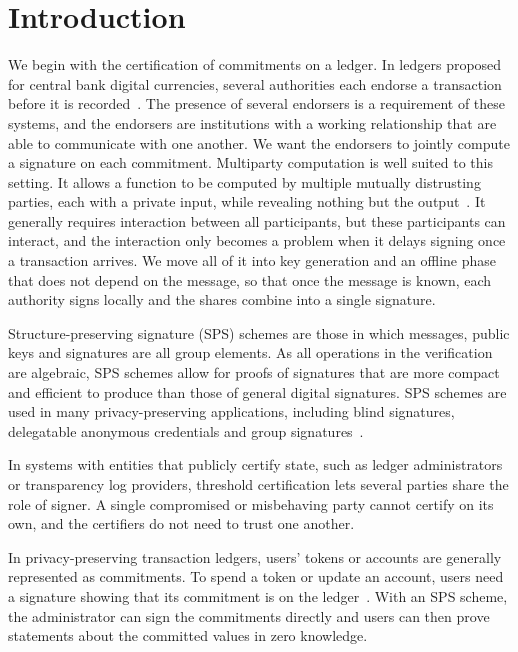 \section{Introduction}\label{sec:tsps-introduction}

We begin with the certification of commitments on a ledger. In ledgers
proposed for central bank digital currencies, several authorities each endorse
a transaction before it is recorded~\cite{androulaki2020auditable}. The
presence of several endorsers is a requirement of these systems, and the
endorsers are institutions with a working relationship that are able to
communicate with one another. We want the endorsers to jointly compute a
signature on each commitment. Multiparty computation is well suited to this
setting. It allows a function to be computed by multiple mutually distrusting
parties, each with a private input, while revealing nothing but the
output~\cite{FOCS:Yao86,STOC:GolMicWig87}. It generally requires interaction
between all participants, but these participants can interact, and the
interaction only becomes a problem when it delays signing once a transaction
arrives. We move all of it into key generation and an offline phase that does
not depend on the message, so that once the message is known, each authority
signs locally and the shares combine into a single signature.

Structure-preserving signature (SPS) schemes are those in which messages,
public keys and signatures are all group elements. As all operations in the verification are
algebraic, SPS schemes allow for proofs of signatures that are more compact and efficient to produce than
those of general digital signatures. SPS schemes are used in many
privacy-preserving applications, including blind signatures,
delegatable anonymous credentials and group
signatures~\cite{AFRICACRYPT:FucVer10,CCS:CamDriDub17,RSA:CriLys19,PoPETS:MSBM23,AC:Groth06,AC:Groth07,C:LibPetYun15}.

In systems with entities that publicly certify state, such as ledger
administrators or transparency log providers, threshold certification lets several
parties share the role of signer. A single compromised or misbehaving party
cannot certify on its own, and the certifiers do not need to trust one another.

In privacy-preserving transaction ledgers, users' tokens or accounts are
generally represented as commitments. To spend a token or update an account,
users need a signature showing that its commitment is on the
ledger~\cite{androulaki2020auditable,CCS:KiaKohSar22,RSA:PoiSan18,NDSS:SABMD19}.
With an SPS scheme, the administrator can sign the commitments directly and
users can then prove statements about the committed values in zero knowledge.

